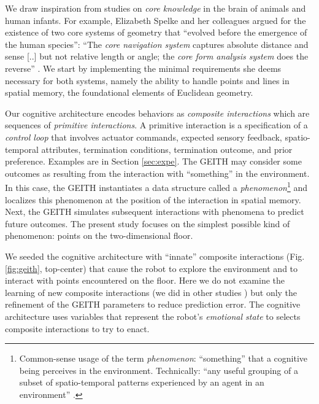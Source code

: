 \documentclass[runningheads]{llncs}
\begin{document}
We draw inspiration from studies on \textit{core knowledge} in the brain of animals and human infants. 
For example, Elizabeth Spelke and her colleagues argued for the existence of two core systems of geometry that ``evolved before the emergence of the human species'':  
``The \textit{core navigation system} captures absolute distance and sense [..] but not relative length or angle; the \textit{core form analysis system} does the reverse'' \cite[p. 2789]{spelke_core_2012}.
We start by implementing the minimal requirements she deems necessary for both systems, namely the ability to handle points and lines in spatial memory, the foundational elements of Euclidean geometry. 

Our cognitive architecture encodes behaviors as \textit{composite interactions} which are sequences of \textit{primitive interactions}.
A primitive interaction is a specification of a \textit{control loop} that involves actuator commands, expected sensory feedback, spatio-temporal attributes, termination conditions, termination outcome, and prior preference. 
Examples are in Section \ref{sec:expe}. 
The GEITH may consider some outcomes as resulting from the interaction with ``something'' in the environment.
In this case, the GEITH instantiates a data structure called a \textit{phenomenon}\footnote{Common-sense usage of the term \textit{phenomenon}: ``something'' that a cognitive being perceives in the environment. Technically: ``any useful grouping of a subset of spatio-temporal patterns experienced by an agent in an environment'' \cite[p. 8]{thorisson_explanation_2021}.} and localizes this phenomenon at the position of the interaction in spatial memory.
Next, the GEITH simulates subsequent interactions with phenomena to predict future outcomes. 
The present study focuses on the simplest possible kind of phenomenon: points on the two-dimensional floor.

We seeded the cognitive architecture with ``innate'' composite interactions (Fig. \ref{fig:geith}, top-center) that cause the robot to explore the environment and to interact with points encountered on the floor. 
Here we do not examine the learning of new composite interactions (we did in other studies \cite{georgeon_cash_2019}) but only the refinement of the GEITH parameters to reduce prediction error.
The cognitive architecture uses variables that represent the robot's \textit{emotional state} to selects composite interactions to try to enact.
\end{document}
